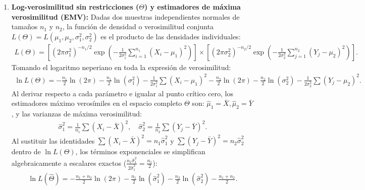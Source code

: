 \begin{solproblema}
	\begin{enumerate}
		\item \textbf{Log-verosimilitud sin restricciones ($\Theta$) y estimadores de máxima verosimilitud (EMV):}
		Dadas dos muestras independientes normales de tamaños $n_1$ y $n_2$, la función de densidad o verosimilitud conjunta $L(\Theta) = L(\mu_1, \mu_2, \sigma_1^2, \sigma_2^2)$ es el producto de las densidades individuales:
		\begin{align}
			L(\Theta) = \left[ (2\pi\sigma_1^2)^{-n_1/2} \exp\left(-\frac{1}{2\sigma_1^2}\sum_{i=1}^{n_1}(X_i - \mu_1)^2\right) \right] \times \left[ (2\pi\sigma_2^2)^{-n_2/2} \exp\left(-\frac{1}{2\sigma_2^2}\sum_{j=1}^{n_2}(Y_j - \mu_2)^2\right) \right].
		\end{align}
		Tomando el logaritmo neperiano en toda la expresión de verosimilitud:
		\begin{align}
			\ln L(\Theta) = -\frac{n_1}{2}\ln(2\pi) - \frac{n_1}{2}\ln(\sigma_1^2) - \frac{1}{2\sigma_1^2}\sum (X_i - \mu_1)^2 -\frac{n_2}{2}\ln(2\pi) - \frac{n_2}{2}\ln(\sigma_2^2) - \frac{1}{2\sigma_2^2}\sum (Y_j - \mu_2)^2.
		\end{align}
		Al derivar respecto a cada parámetro e igualar al punto crítico cero, los estimadores máximo verosímiles en el espacio completo $\Theta$ son: $\hat{\mu}_1 = \bar{X}, \hat{\mu}_2 = \bar{Y}$, y las varianzas de máxima verosimilitud:
		\begin{align}
			\hat{\sigma}_1^2 = \frac{1}{n_1}\sum (X_i - \bar{X})^2, \quad \hat{\sigma}_2^2 = \frac{1}{n_2}\sum (Y_j - \bar{Y})^2.
		\end{align}
		Al sustituir las identidades $\sum(X_i - \bar{X})^2 = n_1\hat{\sigma}_1^2$ y $\sum(Y_j - \bar{Y})^2 = n_2\hat{\sigma}_2^2$ dentro de $\ln L(\Theta)$, los términos exponenciales se simplifican algebraicamente a escalares exactos ($\frac{n_1\hat{\sigma}_1^2}{2\hat{\sigma}_1^2} = \frac{n_1}{2}$):
		\begin{align}
			\ln L(\hat{\Theta}) = -\frac{n_1 + n_2}{2}\ln(2\pi) - \frac{n_1}{2}\ln(\hat{\sigma}_1^2) - \frac{n_2}{2}\ln(\hat{\sigma}_2^2) - \frac{n_1 + n_2}{2}.
		\end{align}
		

\end{enumerate}
\end{solproblema}
